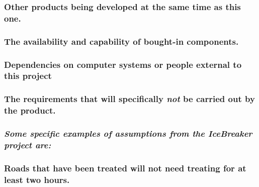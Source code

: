 \documentclass[
]{article}
\begin{document}
\hypertarget{other-products-being-developed-at-the-same-time-as-this-one.}{%
\subsubsection{\texorpdfstring{Other products being developed at the
same time as this one.
}{Other products being developed at the same time as this one. }}\label{other-products-being-developed-at-the-same-time-as-this-one.}}

\hypertarget{the-availability-and-capability-of-bought-in-components.}{%
\subsubsection{The availability and capability of bought-in
components.}\label{the-availability-and-capability-of-bought-in-components.}}

\hypertarget{dependencies-on-computer-systems-or-people-external-to-this-project}{%
\subsubsection{Dependencies on computer systems or people external to
this
project}\label{dependencies-on-computer-systems-or-people-external-to-this-project}}

\hypertarget{the-requirements-that-will-specifically-not-be-carried-out-by-the-product.}{%
\subsubsection{\texorpdfstring{The requirements that will specifically
\emph{not} be carried out by the
product.}{The requirements that will specifically not be carried out by the product.}}\label{the-requirements-that-will-specifically-not-be-carried-out-by-the-product.}}

\hypertarget{some-specific-examples-of-assumptions-from-the-icebreaker-project-are}{%
\subsubsection{\texorpdfstring{\emph{Some specific examples of
assumptions from the IceBreaker project
are:}}{Some specific examples of assumptions from the IceBreaker project are:}}\label{some-specific-examples-of-assumptions-from-the-icebreaker-project-are}}

\hypertarget{roads-that-have-been-treated-will-not-need-treating-for-at-least-two-hours.}{%
\subsubsection{Roads that have been treated will not need treating for
at least two
hours.}\label{roads-that-have-been-treated-will-not-need-treating-for-at-least-two-hours.}}
\end{document}

